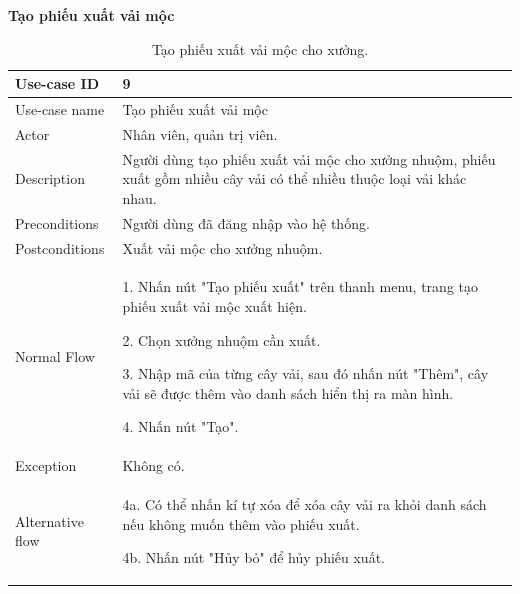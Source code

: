 \newpage
\textbf{Tạo phiếu xuất vải mộc}
\begin{table}[!htp]
    \centering
    \begin{tabular}{|m{3cm}|m{10cm}|}
    \hline 
        Use-case ID & 9\\ \hline
        Use-case name & Tạo phiếu xuất vải mộc\\ \hline
        Actor & Nhân viên, quản trị viên.\\ \hline
        Description & Người dùng tạo phiếu xuất vải mộc cho xưởng nhuộm, phiếu xuất gồm nhiều cây vải có thể nhiều thuộc loại vải khác nhau.\\ \hline
        Preconditions & Người dùng đã đăng nhập vào hệ thống.
        \\ \hline
        Postconditions & Xuất vải mộc cho xưởng nhuộm.\\ \hline
        Normal Flow & 
        1. Nhấn nút "Tạo phiếu xuất" trên thanh menu, trang tạo phiếu xuất vải mộc xuất hiện.\par
        2. Chọn xưởng nhuộm cần xuất.\par
        3. Nhập mã của từng cây vải, sau đó nhấn nút "Thêm", cây vải sẽ được thêm vào danh sách hiển thị ra màn hình.\par
        4. Nhấn nút "Tạo".
        \\ \hline
        Exception & Không có.
        \\ \hline
        Alternative flow & 
        4a. Có thể nhấn kí tự xóa để xóa cây vải ra khỏi danh sách nếu không muốn thêm vào phiếu xuất.\par
        4b. Nhấn nút "Hủy bỏ" để hủy phiếu xuất.
        \\ 
    \hline 
    \end{tabular}
    \caption{Tạo phiếu xuất vải mộc cho xưởng.}
    \label{bang9}
\end{table}

